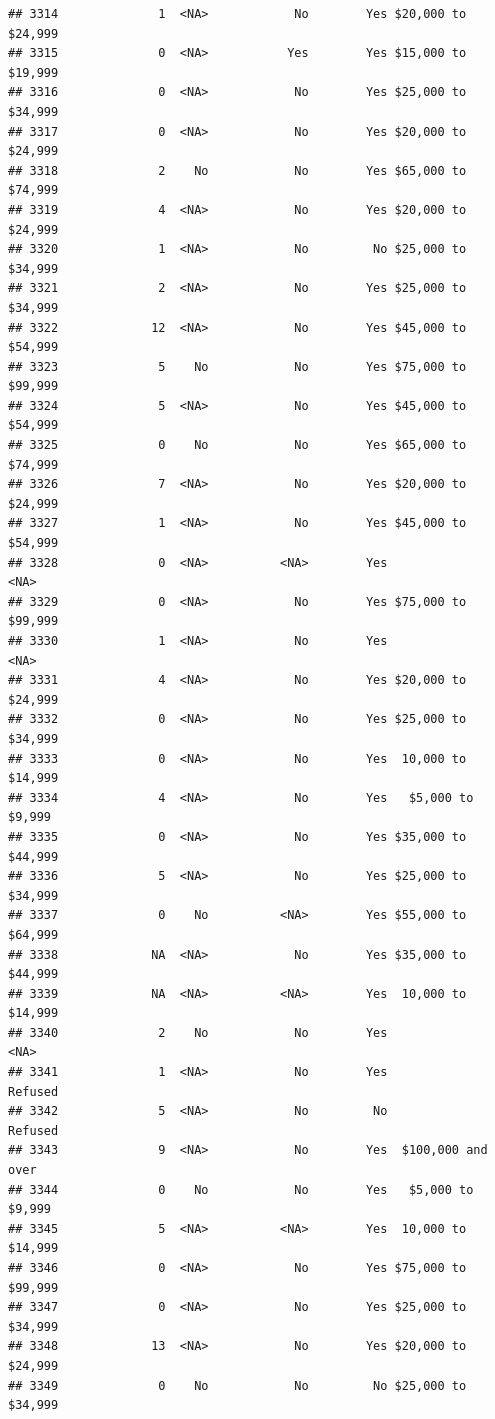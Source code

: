 \documentclass[man]{apa6}
\begin{document}
\begin{verbatim}
## 3314              1  <NA>            No        Yes $20,000 to $24,999
## 3315              0  <NA>           Yes        Yes $15,000 to $19,999
## 3316              0  <NA>            No        Yes $25,000 to $34,999
## 3317              0  <NA>            No        Yes $20,000 to $24,999
## 3318              2    No            No        Yes $65,000 to $74,999
## 3319              4  <NA>            No        Yes $20,000 to $24,999
## 3320              1  <NA>            No         No $25,000 to $34,999
## 3321              2  <NA>            No        Yes $25,000 to $34,999
## 3322             12  <NA>            No        Yes $45,000 to $54,999
## 3323              5    No            No        Yes $75,000 to $99,999
## 3324              5  <NA>            No        Yes $45,000 to $54,999
## 3325              0    No            No        Yes $65,000 to $74,999
## 3326              7  <NA>            No        Yes $20,000 to $24,999
## 3327              1  <NA>            No        Yes $45,000 to $54,999
## 3328              0  <NA>          <NA>        Yes               <NA>
## 3329              0  <NA>            No        Yes $75,000 to $99,999
## 3330              1  <NA>            No        Yes               <NA>
## 3331              4  <NA>            No        Yes $20,000 to $24,999
## 3332              0  <NA>            No        Yes $25,000 to $34,999
## 3333              0  <NA>            No        Yes  10,000 to $14,999
## 3334              4  <NA>            No        Yes   $5,000 to $9,999
## 3335              0  <NA>            No        Yes $35,000 to $44,999
## 3336              5  <NA>            No        Yes $25,000 to $34,999
## 3337              0    No          <NA>        Yes $55,000 to $64,999
## 3338             NA  <NA>            No        Yes $35,000 to $44,999
## 3339             NA  <NA>          <NA>        Yes  10,000 to $14,999
## 3340              2    No            No        Yes               <NA>
## 3341              1  <NA>            No        Yes            Refused
## 3342              5  <NA>            No         No            Refused
## 3343              9  <NA>            No        Yes  $100,000 and over
## 3344              0    No            No        Yes   $5,000 to $9,999
## 3345              5  <NA>          <NA>        Yes  10,000 to $14,999
## 3346              0  <NA>            No        Yes $75,000 to $99,999
## 3347              0  <NA>            No        Yes $25,000 to $34,999
## 3348             13  <NA>            No        Yes $20,000 to $24,999
## 3349              0    No            No         No $25,000 to $34,999

\end{verbatim}
\end{document}
